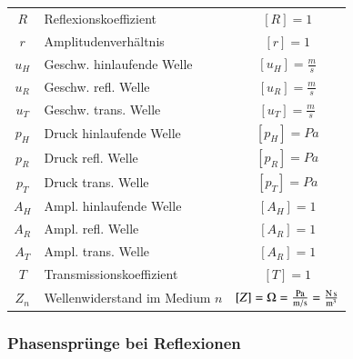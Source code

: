 \renewcommand{\arraystretch}{1.1}
\begin{tabular}{clc}
$R$ & Reflexionskoeffizient  & $[R] = 1$ \\
$r$ & Amplitudenverhältnis  & $[r] = 1$ \\
$u_H$ & Geschw. hinlaufende Welle & $[u_H] = \frac{m}{s}$ \\
$u_R$ & Geschw. refl. Welle & $[u_R] = \frac{m}{s}$ \\
$u_T$ & Geschw. trans. Welle & $[u_T] = \frac{m}{s}$ \\
$p_H$ & Druck hinlaufende Welle & $[p_H] = Pa$ \\
$p_R$ & Druck refl. Welle & $[p_R] = Pa$ \\
$p_T$ & Druck trans. Welle & $[p_T] = Pa$ \\
$A_H$ & Ampl. hinlaufende Welle & $[A_H] = 1$ \\
$A_R$ & Ampl. refl. Welle & $[A_R] = 1$ \\
$A_T$ & Ampl. trans. Welle & $[A_R] = 1$ \\
$T$ & Transmissionskoeffizient & $[T] = 1 $ \\
$Z_n$ & Wellenwiderstand im Medium $n$ & $[Z] = \mathrm{\Omega} = \frac{\mathrm{Pa}}{\mathrm{m} / \mathrm{s}} = \frac{\mathrm{N} \, \mathrm{s}}{\mathrm{m}^3}$ \\
\end{tabular}
\renewcommand{\arraystretch}{1}



\subsubsection{Phasensprünge bei Reflexionen}

